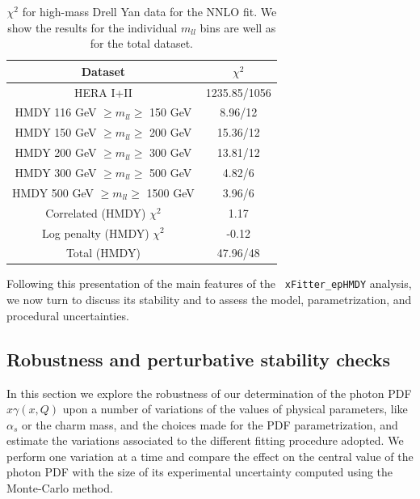 \begin{table}[t]
  \centering
  \begin{tabular}{|c|c|}
    \hline
    Dataset  &   $\chi^2$ \\
    \hline
    \hline
    HERA I+II & 1235.85/1056\\
    \hline
    HMDY  116 GeV $\ge m_{ll} \ge $ 150 GeV  &  8.96/12 \\
    HMDY  150 GeV $\ge m_{ll} \ge $ 200 GeV  &  15.36/12 \\
    HMDY  200 GeV $\ge m_{ll} \ge $ 300 GeV  &  13.81/12 \\
    HMDY  300 GeV $\ge m_{ll} \ge $ 500 GeV  &  4.82/6 \\
    HMDY  500 GeV $\ge m_{ll} \ge $ 1500 GeV &  3.96/6 \\
    \hline
    Correlated (HMDY) $\chi^2$ & 1.17 \\
    Log penalty (HMDY) $\chi^2$  & -0.12 \\
    \hline
    \hline
    Total  (HMDY) & 47.96/48 \\
    \hline
    \end{tabular}
  \caption{$\chi^{2}$ for high-mass Drell Yan data for the NNLO fit.
    We show the results for the individual $m_{ll}$ bins
    are well as for the total dataset.
\label{tab:chi2fit}
  }
\end{table}


Following this presentation of the main features of the {\tt
  xFitter\_epHMDY} analysis, we now turn to discuss its stability and
to assess the model, parametrization, and procedural uncertainties.

\subsection{Robustness and perturbative stability checks}

In this section we explore the robustness of our determination of the
photon PDF $x\gamma(x,Q)$ upon a number of variations of the values of
physical parameters, like $\alpha_s$ or the charm mass, and the
choices made for the PDF parametrization, and estimate the
variations associated to the different fitting procedure adopted.
%
We perform one variation at a time and compare the effect on the
central value of the photon PDF with the size of its experimental
uncertainty computed using the Monte-Carlo method.

